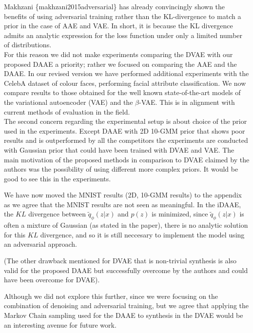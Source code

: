 \documentclass[a4paper,11pt]{article}
\begin{document}
Makhzani \{makhzani2015adversarial\} has already convincingly shown the benefits of using adversarial training rather than the KL-divergence to match a prior in the case of AAE and VAE. In short, it is because the KL divergence admits an analytic expression for the loss function under only a limited number of distributions. \\

For this reason we did not make experiments comparing the DVAE with our proposed DAAE a priority; rather we focused on comparing the AAE and the DAAE. In our revised version we have performed additional experiments with the CelebA dataset of colour faces, performing facial attribute classification. We now compare results to those obtained for the well known state-of-the-art models of the variational autoencoder (VAE) and the $\beta$-VAE. This is in alignment with current methods of evaluation in the field.\\

{\color{blue}
The second concern regarding the experimental setup is about choice of the prior used in the experiments. Except DAAE with 2D 10-GMM prior that shows poor results and is outperformed by all the competitors the experiments are conducted with Gaussian prior that could have been trained with DVAE and VAE. The main motivation of the proposed methods in comparison to DVAE claimed by the authors was the possibility of using different more complex priors. It would be good to see this in the experiments.}\newline 

We have now moved the MNIST results (2D, 10-GMM results) to the appendix as we agree that the MNIST results are not seen as meaningful.  In the iDAAE, the $KL$ divergence between $\tilde{q}_\phi(z|x)$ and $p(z)$ is minimized, since $\tilde{q}_\phi(z|x)$ is often a mixture of Gaussian (as stated in the paper), there is no analytic solution for this $KL$ divergence, and so it is still neccesary to implement the model using an adversarial approach.\newline

{\color{blue}(The other drawback mentioned for DVAE that is non-trivial synthesis is also valid for the proposed DAAE but successfully overcome by the authors and could have been overcome for DVAE)}. \newline

Although we did not explore this further, since we were focusing on the combination of denoising and adversarial training, but we agree that applying the Markov Chain sampling used for the DAAE to synthesis in the DVAE would be an interesting avenue for future work. 
\end{document}
